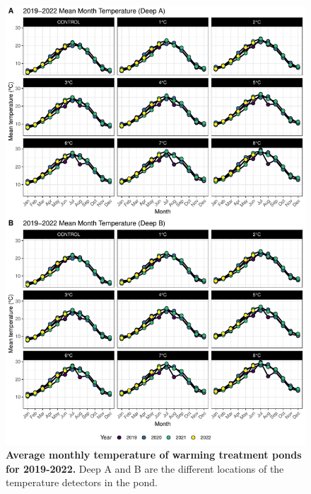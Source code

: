 \begin{figure}[H]
    \centering
    \includegraphics[scale=0.84]{./Figures/Temperature/Mean_month_temp}
    \caption{\textbf{Average monthly temperature of warming treatment ponds for 2019-2022.} Deep A and B are the different locations of the temperature detectors in the pond.}
    \label{fig:mean_m_temp}
\end{figure}

